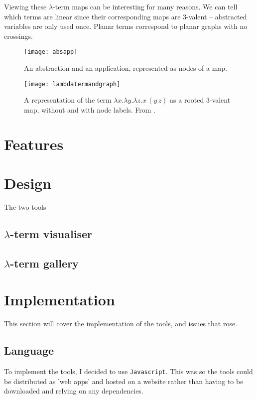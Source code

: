 \documentclass[11pt]{article}
\begin{document}
Viewing these $\lambda$-term maps can be interesting for many reasons. We can tell which terms are linear since their corresponding maps are 3-valent -- abstracted variables are only used once. Planar terms correspond to planar graphs with no crossings.

\begin{figure}
    \centering
    \texttt{[image: absapp]}
    \caption{An abstraction and an application, represented as nodes of a map.}
    \label{fig:absapp}
\end{figure}

\begin{figure}
    \centering
    \texttt{[image: lambdatermandgraph]}
    \caption{A representation of the term $\lambda x. \lambda y. \lambda z. x \, (y \, z)$ as a rooted 3-valent map, without and with node labels. From \protect\cite{zeiljfp}.}
    \label{fig:lambdatermandgrapht}
\end{figure}

\newpage

\section{Features}


\section{Design}
\label{sec:design}

The two tools 

\subsection{\texorpdfstring{$\lambda$}{Lambda}-term visualiser}


\subsection{\texorpdfstring{$\lambda$}{Lambda}-term gallery}



\newpage

\section{Implementation}
\label{sec:implementation}

This section will cover the implementation of the tools, and issues that rose.

\subsection{Language}
To implement the tools, I decided to use \texttt{Javascript}. This was so the tools could be distributed as 'web apps' and hosted on a website rather than having to be downloaded and relying on any dependencies.
\end{document}

